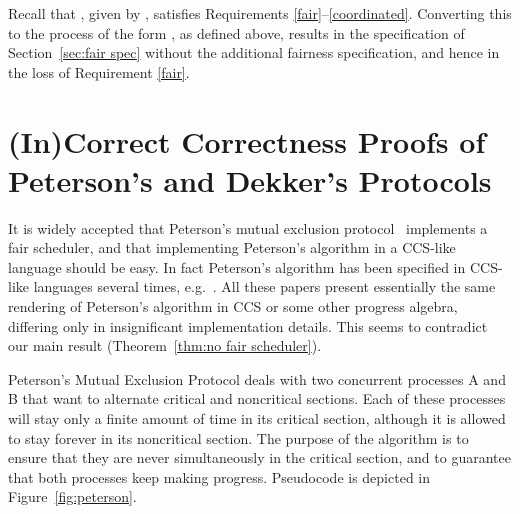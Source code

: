 \documentclass[smallcondensed]{svjour3}
\newcommand{\Sect}[1]{Section~\ref{sec:#1}}
\newcommand{\Fig}[1]{Figure~\ref{fig:#1}}
\begin{document}
Recall that , given by ,
satisfies Requirements \mbox{\ref{fair}--\ref{coordinated}}. 
Converting this  to the process  of the form  , as defined above, results in the specification of \Sect{fair spec}
without the additional fairness specification, and hence in the loss of Requirement \ref{fair}.

\section{\hspace{-0.4pt}(\hspace{-0.1pt}In\hspace{-0.1pt})\hspace{-0.4pt}Correct\hspace{-0.4pt} Correctness\hspace{-0.4pt} Proofs\hspace{-0.4pt} of\hspace{-0.4pt} Peterson's\hspace{-0.4pt} and\hspace{-0.4pt} Dekker's\hspace{-0.4pt} Protocols}\label{sec:discussion}


It is widely accepted that Peterson's mutual exclusion protocol~\cite{Peterson81} implements a fair
scheduler, and that implementing Peterson's algorithm in a CCS-like language should be easy.
In fact Peterson's algorithm has been specified in CCS-like languages several times, e.g.\
\cite{Walker89,Bouali91,Valmari96,AcetoEtAl07}.   All these papers present essentially the same rendering of Peterson's algorithm
in CCS or some other progress algebra, differing only in insignificant implementation details.
This seems to contradict our main result (Theorem~\ref{thm:no fair scheduler}).
\newcommand{\procA}{{\rm A}\xspace}
\newcommand{\procB}{{\rm B}\xspace}

Peterson's Mutual Exclusion Protocol deals with two concurrent processes \procA and \procB that want to
alternate critical and noncritical sections. Each of these processes
will stay only a finite amount of time in its critical section,
although it is allowed to stay forever in its noncritical section.
The purpose of the algorithm is to ensure that they are never
simultaneously in the critical section, and to guarantee that both
processes keep making progress. 
Pseudocode is depicted in \Fig{peterson}.
\end{document}
